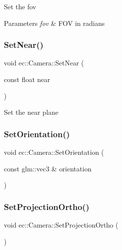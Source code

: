 Set the fov 
\begin{DoxyParams}{Parameters}
{\em fov} & F\+OV in radians \\
\hline
\end{DoxyParams}
\mbox{\label{classec_1_1_camera_af2069e18dee1923fb5d9c77bf9366479}} 
\subsubsection{\texorpdfstring{Set\+Near()}{SetNear()}}
{\footnotesize\ttfamily void ec\+::\+Camera\+::\+Set\+Near (\begin{DoxyParamCaption}\item[{const float}]{near }\end{DoxyParamCaption})}

Set the near plane \mbox{\label{classec_1_1_camera_a274f4356818f347c9452a94070780636}} 
\subsubsection{\texorpdfstring{Set\+Orientation()}{SetOrientation()}}
{\footnotesize\ttfamily void ec\+::\+Camera\+::\+Set\+Orientation (\begin{DoxyParamCaption}\item[{const glm\+::vec3 \&}]{orientation }\end{DoxyParamCaption})}

\mbox{\label{classec_1_1_camera_ad17ef414e3a08344607a4929f89c7ab3}} 
\subsubsection{\texorpdfstring{Set\+Projection\+Ortho()}{SetProjectionOrtho()}}
{\footnotesize\ttfamily void ec\+::\+Camera\+::\+Set\+Projection\+Ortho (\begin{DoxyParamCaption}{ }\end{DoxyParamCaption})}

